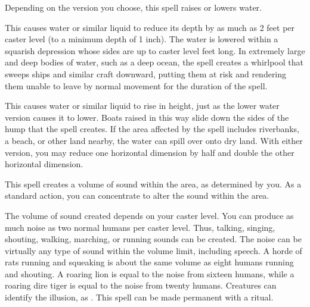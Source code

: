 \spelldur{\durmed \dismissable}
\spellline
\spelleffect Depending on the version you choose, this spell raises or lowers water.
\par {} This causes water or similar liquid to reduce its depth by as much as 2 feet per caster level (to a minimum depth of 1 inch). The water is lowered within a squarish depression whose sides are up to caster level  feet long. In extremely large and deep bodies of water, such as a deep ocean, the spell creates a whirlpool that sweeps ships and similar craft downward, putting them at risk and rendering them unable to leave by normal movement for the duration of the spell.
\par {} This causes water or similar liquid to rise in height, just as the lower water version causes it to lower. Boats raised in this way slide down the sides of the hump that the spell creates. If the area affected by the spell includes riverbanks, a beach, or other land nearby, the water can spill over onto dry land.
\spellnotes With either version, you may reduce one horizontal dimension by half and double the other horizontal dimension.

\spelldur{\durshort \dismissable}
\spellline
\spelleffect This spell creates a volume of sound within the area, as determined by you. As a standard action, you can concentrate to alter the sound within the area.
\par The volume of sound created depends on your caster level. You can produce as much noise as two normal humans per caster level. Thus, talking, singing, shouting, walking, marching, or running sounds can be created. The noise can be virtually any type of sound within the volume limit, including speech. A horde of rats running and squeaking is about the same volume as eight humans running and shouting. A roaring lion is equal to the noise from sixteen humans, while a roaring dire tiger is equal to the noise from twenty humans.
\spellnotes Creatures can identify the illusion, as . This spell can be made permanent with a  ritual.

